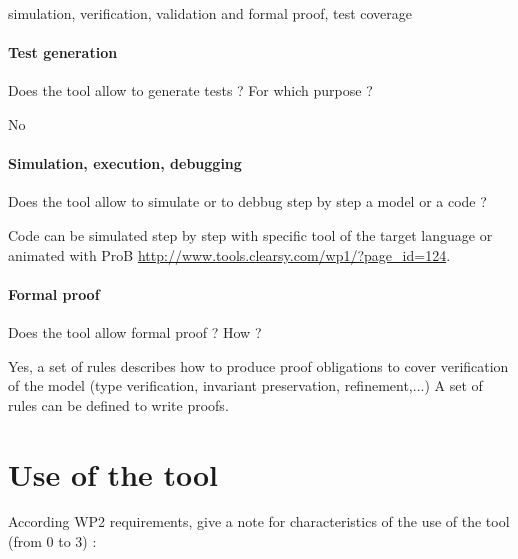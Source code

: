 \begin{author_comment}
simulation, verification, validation and formal proof, test coverage
\end{author_comment}

\paragraph{Test generation}
Does the tool allow to generate tests ? For  which purpose ?

\begin{author_comment}
No
\end{author_comment}

\paragraph{Simulation, execution, debugging}
Does the tool allow to simulate or to debbug step by step a model or a code ?

\begin{author_comment}
Code can be simulated step  by step with specific tool of the target language or animated with ProB \url{http://www.tools.clearsy.com/wp1/?page_id=124}.
\end{author_comment}


\paragraph{Formal proof}
Does the tool allow formal proof ?  How ?

\begin{author_comment}
Yes, a set of rules describes how to  produce proof obligations to cover verification of the model (type verification, invariant preservation, refinement,...)
A set of rules can be defined to  write proofs.  
\end{author_comment}

\section{Use of the tool}


According WP2 requirements, give a note for characteristics of the use of the tool (from 0 to 3) :

